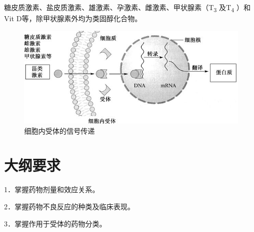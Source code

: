 糖皮质激素、盐皮质激素、雄激素、孕激素、雌激素、甲状腺素（T\textsubscript{3}
及T\textsubscript{4} ）和Vit D等，除甲状腺素外均为类固醇化合物。

\begin{figure}[!htbp]
 \centering
 \includegraphics{./images/Image00022.jpg}
 \captionsetup{justification=centering}
 \caption{细胞内受体的信号传递}
 \label{fig2-13}
  \end{figure} 

\section*{大纲要求}

1．掌握药物剂量和效应关系。

2．掌握药物不良反应的种类及临床表现。

3．掌握作用于受体的药物分类。

